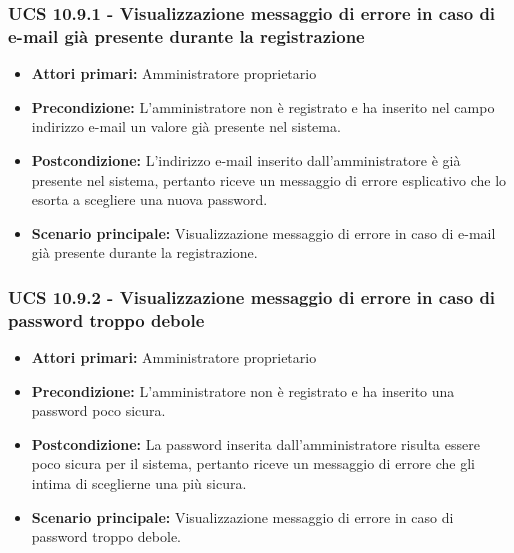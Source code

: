 \subsubsection{UCS 10.9.1 - Visualizzazione messaggio di errore in caso di e-mail già presente durante la registrazione}%
\begin{itemize}
	\item \textbf{Attori primari:} Amministratore proprietario
	\item \textbf{Precondizione:} L'amministratore non è registrato e ha inserito nel campo indirizzo e-mail un valore già presente nel sistema.
	\item \textbf{Postcondizione:} L'indirizzo e-mail inserito dall'amministratore è già presente nel sistema, pertanto riceve un messaggio di errore esplicativo che lo esorta a scegliere una nuova password.
	\item \textbf{Scenario principale:} Visualizzazione messaggio di errore in caso di e-mail già presente durante la registrazione.
\end{itemize}

\subsubsection{UCS 10.9.2 - Visualizzazione messaggio di errore in caso di password troppo debole}%
\begin{itemize}
	\item \textbf{Attori primari:} Amministratore proprietario
	\item \textbf{Precondizione:} L'amministratore non è registrato e ha inserito una password poco sicura.
	\item \textbf{Postcondizione:} La password inserita dall'amministratore risulta essere poco sicura per il sistema, pertanto riceve un messaggio di errore che gli intima di sceglierne una più sicura.
	\item \textbf{Scenario principale:} Visualizzazione messaggio di errore in caso di password troppo debole.
\end{itemize}

